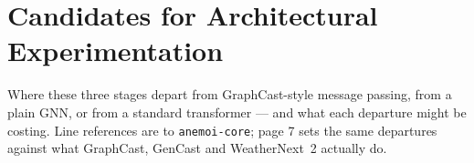 \documentclass[11pt,landscape]{article}
\begin{document}
\clearpage

\section*{Candidates for Architectural Experimentation}

{\small
Where these three stages depart from GraphCast-style message passing, from a
plain GNN, or from a standard transformer --- and what each departure might be
costing.  Line references are to \texttt{anemoi-core}; page 7 sets the same
departures against what GraphCast, GenCast and WeatherNext~2 actually do.
\par}
\end{document}
